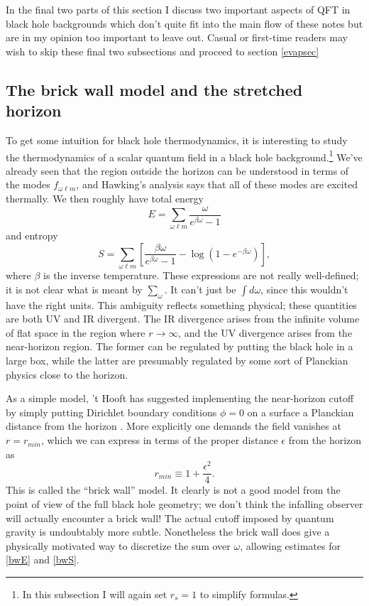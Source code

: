\documentclass[12pt]{article}
\newcommand{\be}{\begin{equation}}
\newcommand{\ee}{\end{equation}}
\begin{document}
In the final two parts of this section I discuss two important aspects of QFT in black hole backgrounds which don't quite fit into the main flow of these notes but are in my opinion too important to leave out.  Casual or first-time readers may wish to skip these final two subsections and proceed to section \ref{evapsec}


\subsection{The brick wall model and the stretched horizon} \label{bricksec}
To get some intuition for black hole thermodynamics, it is interesting to study the thermodynamics of a scalar quantum field in a black hole background.\footnote{In this subsection I will again set $r_s=1$ to simplify formulas.}  We've already seen that the region outside the horizon can be understood in terms of the modes $f_{\omega \ell m}$, and Hawking's analysis says that all of these modes are excited thermally.  We then roughly have total energy
\be\label{bwE}
E=\sum_{\omega \ell m}\frac{\omega}{e^{\beta\omega}-1}
\ee
and entropy
\be\label{bwS}
S=\sum_{\omega \ell m}\left[\frac{\beta\omega}{e^{\beta\omega}-1}-\log\left(1-e^{-\beta\omega}\right)\right],
\ee
where $\beta$ is the inverse temperature.  These expressions are not really well-defined; it is not clear what is meant by $\sum_{\omega}$.  It can't just be $\int d\omega$, since this wouldn't have the right units.  This ambiguity reflects something physical; these quantities are both UV and IR divergent.  The IR divergence arises from the infinite volume of flat space in the region where $r\to \infty$, and the UV divergence arises from the near-horizon region.  The former can be regulated by putting the black hole in a large box, while the latter are presumably regulated by some sort of Planckian physics close to the horizon.  

As a simple model, 't Hooft has suggested implementing the near-horizon cutoff by simply putting Dirichlet boundary conditions $\phi=0$ on a surface a Planckian distance from the horizon \cite{'tHooft:1984re}.  More explicitly one demands the field vanishes at $r=r_{min}$, which we can express in terms of the proper distance $\epsilon$ from the horizon as
\be
r_{min}\equiv 1+\frac{\epsilon^2}{4}.
\ee
This is called the ``brick wall'' model.  It clearly is not a good model from the point of view of the full black hole geometry; we don't think the infalling observer will actually encounter a brick wall!  The actual cutoff imposed by quantum gravity is undoubtably more subtle.  Nonetheless the brick wall does give a physically motivated way to discretize the sum over $\omega$, allowing estimates for \eqref{bwE} and \eqref{bwS}.  
\end{document}
